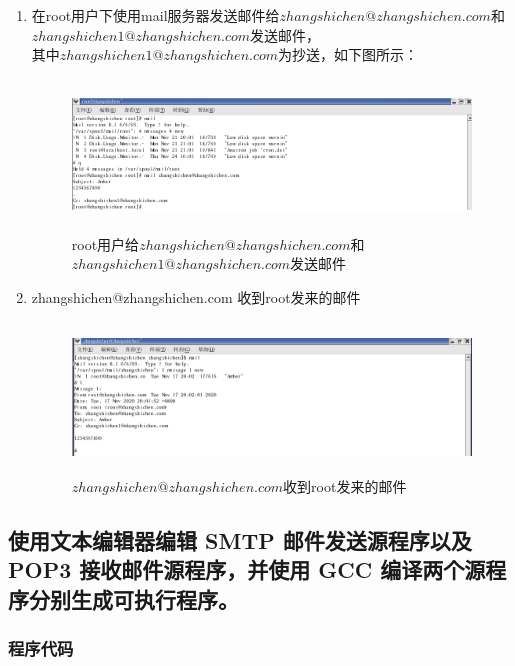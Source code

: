\documentclass{article}
\begin{document}
\begin{enumerate}
\item 在root用户下使用mail服务器发送邮件给$zhangshichen@zhangshichen.com$和$zhangshichen1@zhangshichen.com$发送邮件，\\其中$zhangshichen1@zhangshichen.com$为抄送，如下图所示：
\begin{figure}[h]
    \centering
    \includegraphics[width=11cm,height=4cm]{1.png}
    \caption{root用户给$zhangshichen@zhangshichen.com$和$zhangshichen1@zhangshichen.com$发送邮件}
\end{figure}
\item zhangshichen@zhangshichen.com 收到root发来的邮件
\begin{figure}[h]
    \centering
    \includegraphics[width=13cm,height=4cm]{2.png}
    \caption{$zhangshichen@zhangshichen.com$收到root发来的邮件}
\end{figure}
\end{enumerate}
\subsection{使用文本编辑器编辑 SMTP 邮件发送源程序以及 POP3 接收邮件源程序，并使用 GCC 编译两个源程序分别生成可执行程序。}
\subsubsection{程序代码}


\end{document}

